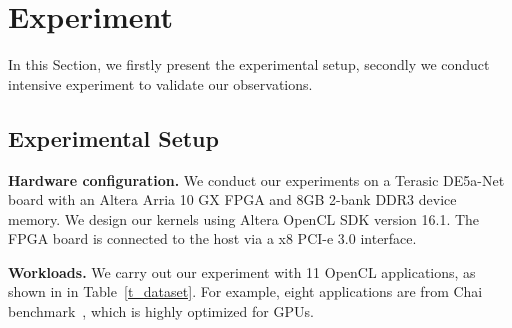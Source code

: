 \section{Experiment}
\label{sec_experiment}






In this Section, we firstly present the experimental setup, secondly we conduct intensive experiment to validate our observations. 
\vspace{-1ex}
\subsection{Experimental Setup}
\label{subsec_experiment_stup}
{\bf Hardware configuration.}
We conduct our experiments on a Terasic DE5a-Net board with an Altera Arria 10 GX FPGA and 8GB 2-bank DDR3 device memory. We design our kernels using Altera OpenCL SDK version 16.1. The FPGA board is connected to the host via a x8 PCI-e 3.0 interface.
	

{\bf Workloads. }We carry out our experiment with 11 OpenCL applications, as shown in in Table~\ref{t_dataset}. 
For example, eight applications are from Chai benchmark~\cite{chang2017collaborative}, which is highly optimized for GPUs.%


